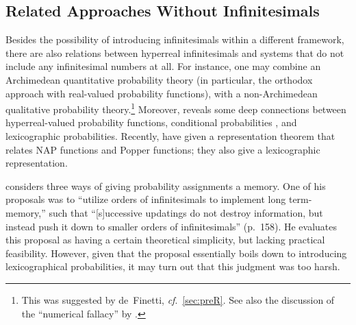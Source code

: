 \subsection{Related Approaches Without Infinitesimals}
Besides the possibility of introducing infinitesimals within a different framework, there are also relations between hyperreal infinitesimals and systems that do not include any infinitesimal numbers at all. For instance, one may combine an Archimedean quantitative probability theory (in particular, the orthodox approach with real-valued probability functions), with a non-Archimedean qualitative probability theory.\footnote{This was suggested by de~Finetti, \textit{cf}.\ \autoref{sec:preR}. See also the discussion of the ``numerical fallacy'' by \citet{Easwaran:2014}.} Moreover, \citet{Halpern:2010} reveals some deep connections between hyperreal-valued probability functions, conditional probabilities \citep[including Popper functions; see also Vann][]{McGee:1994}, and lexicographic probabilities. Recently, \citet{BrickhillHorsten:2018} have given a representation theorem that relates NAP functions and Popper functions; they also give a lexicographic representation.

\citet{Skyrms:1983b} considers three ways of giving probability assignments a memory. One of his proposals was to ``utilize orders of infinitesimals to implement long term-memory,'' such that ``[s]uccessive updatings do not destroy information, but instead push it down to smaller orders of infinitesimals'' (p.~158).
He evaluates this proposal as having a certain theoretical simplicity, but lacking practical feasibility. However, given that the proposal essentially boils down to introducing lexicographical probabilities, it may turn out that this judgment was too harsh.


